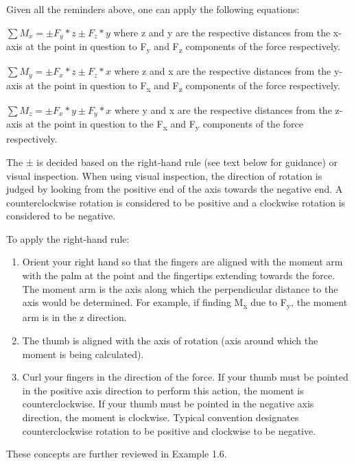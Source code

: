 \documentclass[
  letterpaper,
  DIV=11,
  numbers=noendperiod]{scrreprt}
\theoremstyle{definition}
\theoremstyle{remark}
\begin{document}
Given all the reminders above, one can apply the following equations:

\(\sum M_x= \pm F_y * z \pm F_z * y\) where z and y are the respective
distances from the x-axis at the point in question to F\textsubscript{y}
and F\textsubscript{z} components of the force respectively.

\(\sum M_y= \pm F_x * z \pm F_z * x\) where z and x are the respective
distances from the y-axis at the point in question to F\textsubscript{x}
and F\textsubscript{z} components of the force respectively.

\(\sum M_z= \pm F_x * y \pm F_y * x\) where y and x are the respective
distances from the z-axis at the point in question to the
F\textsubscript{x} and F\textsubscript{y} components of the force
respectively.

The ± is decided based on the right-hand rule (see text below for
guidance) or visual inspection. When using visual inspection, the
direction of rotation is judged by looking from the positive end of the
axis towards the negative end. A counterclockwise rotation is considered
to be positive and a clockwise rotation is considered to be negative.

To apply the right-hand rule:

\begin{enumerate}
\def\labelenumi{\arabic{enumi}.}
\item
  Orient your right hand so that the fingers are aligned with the moment
  arm with the palm at the point and the fingertips extending towards
  the force. The moment arm is the axis along which the perpendicular
  distance to the axis would be determined. For example, if finding
  M\textsubscript{x} due to F\textsubscript{y}, the moment arm is in the
  z direction.
\item
  The thumb is aligned with the axis of rotation (axis around which the
  moment is being calculated).
\item
  Curl your fingers in the direction of the force. If your thumb must be
  pointed in the positive axis direction to perform this action, the
  moment is counterclockwise. If your thumb must be pointed in the
  negative axis direction, the moment is clockwise. Typical convention
  designates counterclockwise rotation to be positive and clockwise to
  be negative.
\end{enumerate}

These concepts are further reviewed in Example 1.6.
\end{document}
